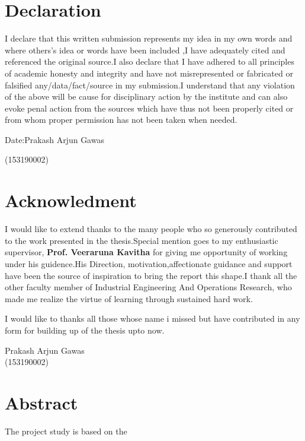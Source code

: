\documentclass[10pt,a4paper,oneside]{report}
\date{}
\begin{document}

\chapter*{Declaration}
I declare that this written submission represents my idea in my own words and where others's idea or words have been included ,I have adequately cited and referenced the original source.I also declare that I have adhered to all principles of academic honesty and integrity and have not misrepresented or fabricated or falsified any/data/fact/source in my submission.I understand that any violation of the above will be cause for disciplinary action by the institute and can also evoke penal action from the sources which have thus not been properly cited or from whom proper permission has not been taken when needed.
\vspace{1cm}


\noindent Date:\hfill Prakash Arjun Gawas                     
\begin{flushright}(153190002)\end{flushright}
\chapter*{Acknowledment}
I would like to extend thanks to the many people who so generously contributed to the work presented in the thesis.Special mention goes to my enthusiastic supervisor, \textbf{Prof. Veeraruna Kavitha} for giving me opportunity of working under his guidence.His Direction, motivation,affectionate guidance and support have been the source of inspiration to bring the report this shape.I thank all the other faculty member of Industrial Engineering And Operations Research, who made me realize the virtue of learning through sustained hard work.
\vspace{6mm}

\noindent I would like to thanks all those whose name i missed but have contributed in any form for building up of the thesis upto now.
\vspace{1cm}

\begin{flushright}
Prakash Arjun Gawas\\
(153190002)
\end{flushright}

\chapter*{Abstract}
The project study is based on the
\tableofcontents
\listoffigures
\listoftables
\end{document}
